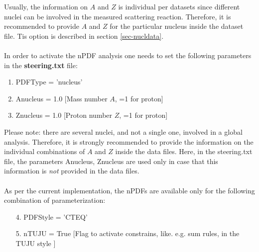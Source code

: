 \documentclass{article}
\begin{document}
Usually, the information on $A$ and $Z$ is individual per datasets since different nuclei can be involved in the measured scattering reaction. Therefore, it is recommended to provide $A$ and $Z$ for the particular nucleus inside the dataset file. Tis option is described in section \ref{sec-nucldata}.\\ 
\\
In order to activate the nPDF analysis one needs to set the following parameters in the \textbf{steering.txt} file:
\begin{enumerate}
\item PDFType = 'nucleus'
\item Anucleus = 1.0 [Mass number $A$, =1 for proton]
\item Znucleus = 1.0 [Proton number $Z$, =1 for proton]
\end{enumerate}
\vskip 0.2in
\noindent Please note: there are several nuclei, and not a single one, involved in a global analysis. Therefore, it is strongly recommended to provide the information on the individual combinations of $A$ and $Z$ inside the data files. Here, in the steering.txt file, the parameters Anucleus, Znucleus are used only in case that this information is \textit{not} provided in the data files.\\
\\
As per the current implementation, the nPDFs are available only for the following combination of parameterization:
\begin{enumerate}
\item[4.] PDFStyle = 'CTEQ'
\item[5.] nTUJU = True [Flag to activate constrains, like. e.g. sum rules, in the TUJU style \cite{tuju19}]
\end{enumerate}
\end{document}
